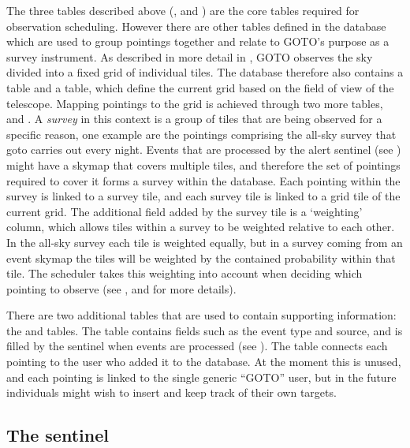 \begin{colsection}
\begin{colsection}
The three tables described above (,  and ) are the core tables required for observation scheduling. However there are other tables defined in the database which are used to group pointings together and relate to GOTO's purpose as a survey instrument. As described in more detail in , GOTO observes the sky divided into a fixed grid of individual tiles. The database therefore also contains a  table and a  table, which define the current grid based on the field of view of the telescope. Mapping pointings to the grid is achieved through two more tables,  and . A \textit{survey} in this context is a group of tiles that are being observed for a specific reason, one example are the pointings comprising the all-sky survey that \gls{goto} carries out every night. Events that are processed by the alert sentinel (see ) might have a skymap that covers multiple tiles, and therefore the set of pointings required to cover it forms a survey within the database. Each pointing within the survey is linked to a survey tile, and each survey tile is linked to a grid tile of the current grid. The additional field added by the survey tile is a `weighting' column, which allows tiles within a survey to be weighted relative to each other. In the all-sky survey each tile is weighted equally, but in a survey coming from an event skymap the tiles will be weighted by the contained probability within that tile. The scheduler takes this weighting into account when deciding which pointing to observe (see , and  for more details).

There are two additional tables that are used to contain supporting information: the  and  tables. The  table contains fields such as the event type and source, and is filled by the sentinel when events are processed (see ). The  table connects each pointing to the user who added it to the database. At the moment this is unused, and each pointing is linked to the single generic ``GOTO'' user, but in the future individuals might wish to insert and keep track of their own targets.

\end{colsection}


\subsection{The sentinel}
\label{sec:sentinel}
\begin{colsection}


\end{colsection}
\end{colsection}
